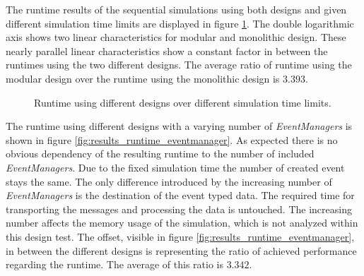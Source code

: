 The runtime results of the sequential simulations using both designs and given different simulation time limits are displayed in figure \ref{fig:results_runtime_sim_time}.
The double logarithmic axis shows two linear characteristics for modular and monolithic design.
These nearly parallel linear characteristics show a constant factor in between the runtimes using the two different designs.
The average ratio of runtime using the modular design over the runtime using the monolithic design is $3.393$.
\\

\begin{figure}
    \centering
    \caption{Runtime using different designs over different simulation time limits.}
    \label{fig:results_runtime_sim_time}
\end{figure}

The runtime using different designs with a varying number of \emph{EventManagers} is shown in figure \ref{fig:results_runtime_eventmanager}.
As expected there is no obvious dependency of the resulting runtime to the number of included \emph{EventManagers}.
Due to the fixed simulation time the number of created event stays the same.
The only difference introduced by the increasing number of \emph{EventManagers} is the destination of the event typed data.
The required time for transporting the messages and processing the data is untouched.
The increasing number affects the memory usage of the simulation, which is not analyzed within this design test.
The offset, visible in figure \ref{fig:results_runtime_eventmanager}, in between the different designs is representing the ratio of achieved performance regarding the runtime.
The average of this ratio is $3.342$.
\\

